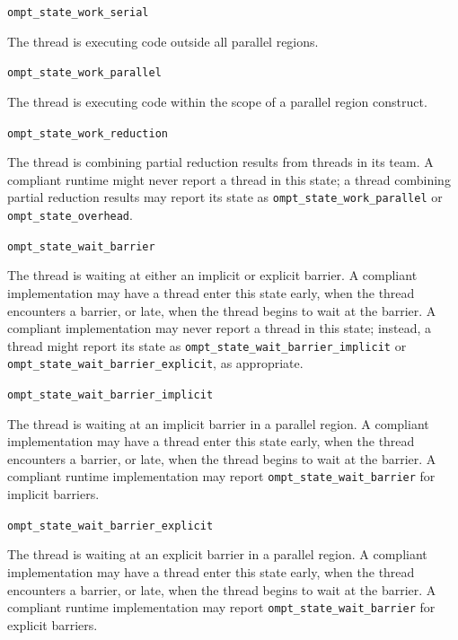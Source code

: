 \documentclass{article}
\newcommand{\descheader}[1]{{\needspace{3\baselineskip}\vspace{1em}\noindent \fbox{#1}}}
\begin{document}
\begin{description}

\item \verb|ompt_state_work_serial| 

  The thread is executing code outside all parallel regions. 

\item \verb|ompt_state_work_parallel| 

  The thread is executing code within the scope of a parallel region construct.

\sloppy
\item \verb|ompt_state_work_reduction| 
 
  The thread is combining partial reduction results from threads in its team. A compliant
  runtime might never report a thread in this state; a thread
  combining partial reduction results may  report its state as
  \verb|ompt_state_work_parallel| or \verb|ompt_state_overhead|.

\end{description}

\descheader{Barrier Wait States}

\begin{description}

  \item \verb|ompt_state_wait_barrier| 
  
  \sloppy
  The thread is waiting at either an implicit or explicit barrier.
  A  compliant implementation may have a thread enter this state
  early, when the thread encounters a barrier, or late, when the
  thread begins to wait at the barrier. A  compliant implementation may never report a thread in this state; instead, a thread might report its state as \verb|ompt_state_wait_barrier_implicit|  or \verb|ompt_state_wait_barrier_explicit|, as appropriate.
  
  \item \verb|ompt_state_wait_barrier_implicit| 
  
\sloppy
  The thread is waiting at an implicit barrier in a parallel region. 
  A  compliant implementation may have a thread enter this state
  early, when the thread encounters a barrier, or late, when the
  thread begins to wait at the barrier.
  A  compliant runtime implementation may report \verb|ompt_state_wait_barrier| for implicit barriers.
  
    \item \verb|ompt_state_wait_barrier_explicit| 

  The thread is waiting at an explicit barrier  in a parallel region. 
  A  compliant implementation may have a thread enter this state
  early, when the thread encounters a barrier, or late, when the
  thread begins to wait at the barrier.
  A  compliant runtime implementation may report \verb|ompt_state_wait_barrier| for explicit barriers.
  
\end{description}
  
\end{document}
